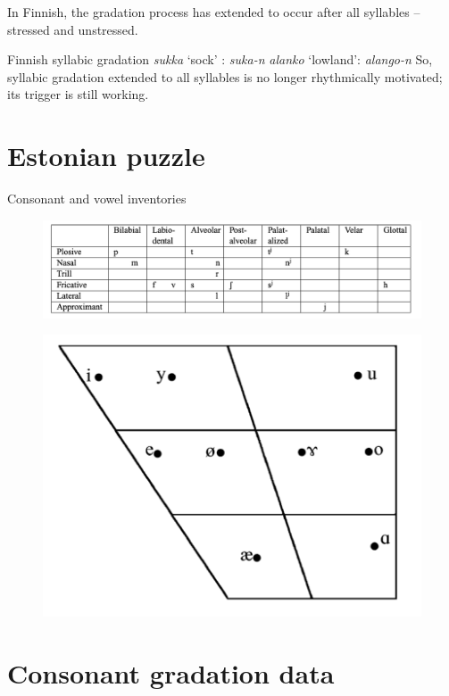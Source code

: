 \documentclass[a4paper, 12pt]{article}
\begin{document}
	In Finnish, the gradation process has extended to occur after all syllables -- stressed and unstressed. 
	
	\pex\label{fingrad}Finnish syllabic gradation
		\a \emph{sukka} `sock' : {\Gen} \emph{suka-n}
		\a \emph{alanko} `lowland': {\Gen} \emph{alango-n} 
	\xe
	So, syllabic gradation extended to all syllables is no longer rhythmically motivated; its trigger is still working.

	\section{Estonian puzzle}
	
	Consonant and vowel inventories \parencite{asu-teras2009}
	
	\begin{figure}[H]
		\includegraphics[scale=.6]{est-consonants}
	\end{figure}
		
	\begin{figure}[H]
		\includegraphics[scale=.5]{est-vowels}
	\end{figure}

	\section{Consonant gradation data}
	
\end{document}

